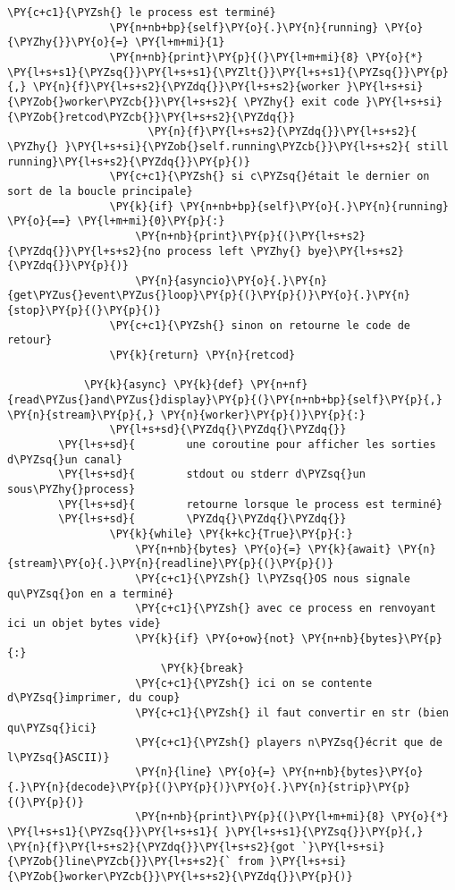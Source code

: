 \begin{Verbatim}[commandchars=\\\{\}]
                \PY{c+c1}{\PYZsh{} le process est terminé}
                \PY{n+nb+bp}{self}\PY{o}{.}\PY{n}{running} \PY{o}{\PYZhy{}}\PY{o}{=} \PY{l+m+mi}{1}
                \PY{n+nb}{print}\PY{p}{(}\PY{l+m+mi}{8} \PY{o}{*} \PY{l+s+s1}{\PYZsq{}}\PY{l+s+s1}{\PYZlt{}}\PY{l+s+s1}{\PYZsq{}}\PY{p}{,} \PY{n}{f}\PY{l+s+s2}{\PYZdq{}}\PY{l+s+s2}{worker }\PY{l+s+si}{\PYZob{}worker\PYZcb{}}\PY{l+s+s2}{ \PYZhy{} exit code }\PY{l+s+si}{\PYZob{}retcod\PYZcb{}}\PY{l+s+s2}{\PYZdq{}}
                      \PY{n}{f}\PY{l+s+s2}{\PYZdq{}}\PY{l+s+s2}{ \PYZhy{} }\PY{l+s+si}{\PYZob{}self.running\PYZcb{}}\PY{l+s+s2}{ still running}\PY{l+s+s2}{\PYZdq{}}\PY{p}{)}
                \PY{c+c1}{\PYZsh{} si c\PYZsq{}était le dernier on sort de la boucle principale}
                \PY{k}{if} \PY{n+nb+bp}{self}\PY{o}{.}\PY{n}{running} \PY{o}{==} \PY{l+m+mi}{0}\PY{p}{:}
                    \PY{n+nb}{print}\PY{p}{(}\PY{l+s+s2}{\PYZdq{}}\PY{l+s+s2}{no process left \PYZhy{} bye}\PY{l+s+s2}{\PYZdq{}}\PY{p}{)}
                    \PY{n}{asyncio}\PY{o}{.}\PY{n}{get\PYZus{}event\PYZus{}loop}\PY{p}{(}\PY{p}{)}\PY{o}{.}\PY{n}{stop}\PY{p}{(}\PY{p}{)}
                \PY{c+c1}{\PYZsh{} sinon on retourne le code de retour}
                \PY{k}{return} \PY{n}{retcod}
        
            \PY{k}{async} \PY{k}{def} \PY{n+nf}{read\PYZus{}and\PYZus{}display}\PY{p}{(}\PY{n+nb+bp}{self}\PY{p}{,} \PY{n}{stream}\PY{p}{,} \PY{n}{worker}\PY{p}{)}\PY{p}{:}
                \PY{l+s+sd}{\PYZdq{}\PYZdq{}\PYZdq{}}
        \PY{l+s+sd}{        une coroutine pour afficher les sorties d\PYZsq{}un canal}
        \PY{l+s+sd}{        stdout ou stderr d\PYZsq{}un sous\PYZhy{}process}
        \PY{l+s+sd}{        retourne lorsque le process est terminé}
        \PY{l+s+sd}{        \PYZdq{}\PYZdq{}\PYZdq{}}
                \PY{k}{while} \PY{k+kc}{True}\PY{p}{:}
                    \PY{n+nb}{bytes} \PY{o}{=} \PY{k}{await} \PY{n}{stream}\PY{o}{.}\PY{n}{readline}\PY{p}{(}\PY{p}{)}
                    \PY{c+c1}{\PYZsh{} l\PYZsq{}OS nous signale qu\PYZsq{}on en a terminé}
                    \PY{c+c1}{\PYZsh{} avec ce process en renvoyant ici un objet bytes vide}
                    \PY{k}{if} \PY{o+ow}{not} \PY{n+nb}{bytes}\PY{p}{:}
                        \PY{k}{break}
                    \PY{c+c1}{\PYZsh{} ici on se contente d\PYZsq{}imprimer, du coup}
                    \PY{c+c1}{\PYZsh{} il faut convertir en str (bien qu\PYZsq{}ici}
                    \PY{c+c1}{\PYZsh{} players n\PYZsq{}écrit que de l\PYZsq{}ASCII)}
                    \PY{n}{line} \PY{o}{=} \PY{n+nb}{bytes}\PY{o}{.}\PY{n}{decode}\PY{p}{(}\PY{p}{)}\PY{o}{.}\PY{n}{strip}\PY{p}{(}\PY{p}{)}
                    \PY{n+nb}{print}\PY{p}{(}\PY{l+m+mi}{8} \PY{o}{*} \PY{l+s+s1}{\PYZsq{}}\PY{l+s+s1}{ }\PY{l+s+s1}{\PYZsq{}}\PY{p}{,} \PY{n}{f}\PY{l+s+s2}{\PYZdq{}}\PY{l+s+s2}{got `}\PY{l+s+si}{\PYZob{}line\PYZcb{}}\PY{l+s+s2}{` from }\PY{l+s+si}{\PYZob{}worker\PYZcb{}}\PY{l+s+s2}{\PYZdq{}}\PY{p}{)}
        

\end{Verbatim}
